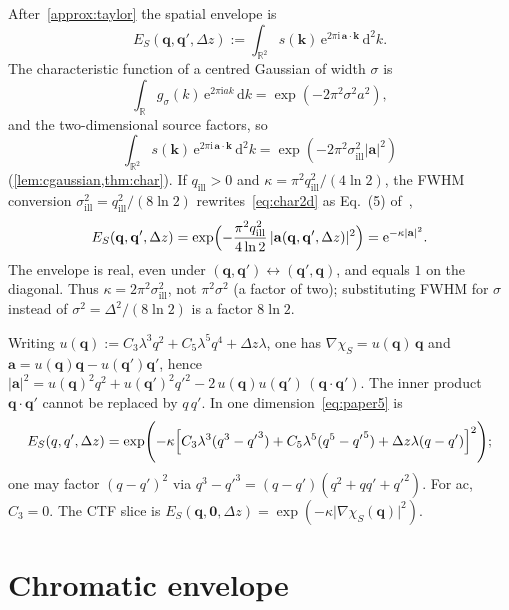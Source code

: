 \documentclass[11pt,a4paper]{article}
\theoremstyle{definition}
\theoremstyle{remark}
\newcommand{\R}{\mathbb{R}}
\newcommand{\dd}{\mathrm{d}}
\newcommand{\ee}{\mathrm{e}}
\newcommand{\ii}{\mathrm{i}}
\newcommand{\abs}[1]{\lvert#1\rvert}
\newcommand{\qill}{q_{\mathrm{ill}}}
\newcommand{\sill}{\sigma_{\mathrm{ill}}}
\newcommand{\Dz}{\Delta z}
\newcommand{\EStot}{E_{S}}
\begin{document}
After~\cref{approx:taylor} the spatial envelope is
\begin{equation}
\label{eq:ESint}
\EStot(\mathbf{q},\mathbf{q}',\Dz)
:=\int_{\R^2}
s(\mathbf{k})\,\ee^{2\pi\ii\,\mathbf{a}\cdot\mathbf{k}}\,\dd^2k.
\end{equation}
The characteristic function of a centred Gaussian of width $\sigma$ is
\begin{equation}
\label{eq:char1d}
\int_{\R}g_\sigma(k)\,\ee^{2\pi\ii a k}\,\dd k
=\exp(-2\pi^2\sigma^2 a^2),
\end{equation}
and the two-dimensional source factors, so
\begin{equation}
\label{eq:char2d}
\int_{\R^2}s(\mathbf{k})\,\ee^{2\pi\ii\,\mathbf{a}\cdot\mathbf{k}}\,\dd^2k
=\exp(-2\pi^2\sill^2\abs{\mathbf{a}}^2)
\end{equation}
(\cref{lem:cgaussian,thm:char}).
If $\qill>0$ and $\kappa=\pi^2\qill^2/(4\ln 2)$, the FWHM conversion
$\sill^2=\qill^2/(8\ln 2)$ rewrites~\eqref{eq:char2d} as Eq.~(5)
of~\cite{Yu2019},
\begin{equation}
\label{eq:paper5}
\EStot(\mathbf{q},\mathbf{q}',\Dz)
=\exp\Bigl(-\frac{\pi^2\qill^2}{4\ln 2}\,
\abs{\mathbf{a}(\mathbf{q},\mathbf{q}',\Dz)}^2\Bigr)
=\ee^{-\kappa\abs{\mathbf{a}}^2}.
\end{equation}
The envelope is real, even under
$(\mathbf{q},\mathbf{q}')\leftrightarrow(\mathbf{q}',\mathbf{q})$,
and equals $1$ on the diagonal.
Thus $\kappa=2\pi^2\sill^2$, not $\pi^2\sigma^2$ (a factor of two);
substituting FWHM for $\sigma$ instead of $\sigma^2=\Delta^2/(8\ln 2)$
is a factor $8\ln 2$.

Writing $u(\mathbf{q}):=C_3\lambda^3 q^2+C_5\lambda^5 q^4+\Dz\lambda$,
one has $\nabla\chi_S=u(\mathbf{q})\,\mathbf{q}$ and
$\mathbf{a}=u(\mathbf{q})\mathbf{q}-u(\mathbf{q}')\mathbf{q}'$, hence
$\abs{\mathbf{a}}^2
=u(\mathbf{q})^2 q^2+u(\mathbf{q}')^2{q'}^2
-2\,u(\mathbf{q})u(\mathbf{q}')\,(\mathbf{q}\cdot\mathbf{q}')$.
The inner product $\mathbf{q}\cdot\mathbf{q}'$ cannot be replaced by
$q\,q'$.
In one dimension~\eqref{eq:paper5} is
\begin{equation}
\label{eq:ES1d}
\EStot(q,q',\Dz)
=\exp\Biggl(
-\kappa
\Bigl[
C_3\lambda^3(q^3-{q'}^3)
+C_5\lambda^5(q^5-{q'}^5)
+\Dz\lambda(q-q')
\Bigr]^2
\Biggr);
\end{equation}
one may factor $(q-q')^2$ via $q^3-{q'}^3=(q-q')(q^2+qq'+{q'}^2)$.
For ac, $C_3=0$.
The CTF slice is
$\EStot(\mathbf{q},\mathbf{0},\Dz)=\exp(-\kappa\abs{\nabla\chi_S(\mathbf{q})}^2)$.

\section{Chromatic envelope}
\label{sec:chromatic}
\end{document}
